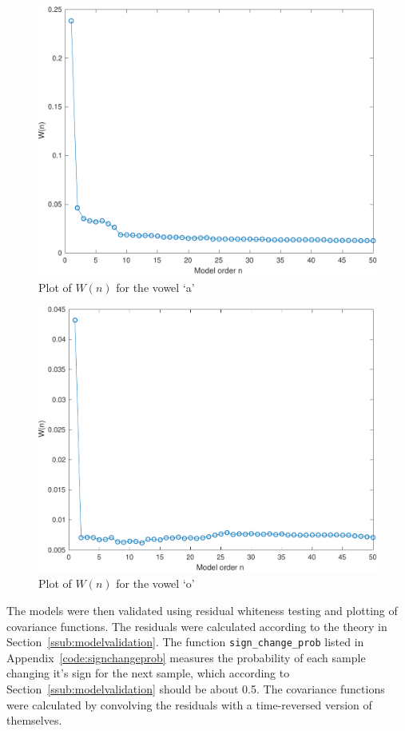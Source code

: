 \documentclass{IEEEtran}
\newcommand{\code}[1]{\texttt{#1}}
\begin{document}
\begin{figure}[h!]
    \centering
    \captionsetup{justification=centering}
    \includegraphics[width=0.8\columnwidth]{pictures/wna.pdf}
    \caption{Plot of $W(n)$ for the vowel `a'}
    \label{fig:wna}
\end{figure}

\begin{figure}[h!]
    \centering
    \captionsetup{justification=centering}
    \includegraphics[width=0.8\columnwidth]{pictures/wno.pdf}
    \caption{Plot of $W(n)$ for the vowel `o'}
    \label{fig:wno}
\end{figure}

The models were then validated using residual whiteness testing and plotting of
covariance functions. The residuals were calculated according to the theory in
Section~\ref{ssub:modelvalidation}. The function \code{sign\_change\_prob}
listed in Appendix~\ref{code:signchangeprob}
measures the probability of each sample changing it's sign for the next
sample, which according to Section~\ref{ssub:modelvalidation} should be about
0.5. The covariance functions were calculated by convolving the residuals with
a time-reversed version of themselves.
\end{document}

